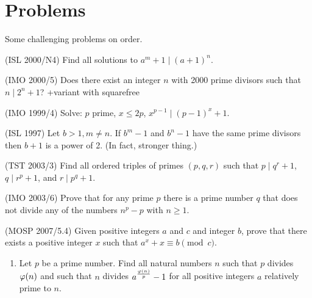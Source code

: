 %
\section{Problems}
Some challenging problems on order.

(ISL 2000/N4) Find all solutions to $a^m+1\mid (a+1)^n$.

(IMO 2000/5) Does there exist an integer $n$ with 2000 prime divisors such that $n\mid 2^n+1$? +variant with squarefree

(IMO 1999/4) Solve: $p$ prime, $x\le 2p$, $x^{p-1}\mid (p-1)^x+1$.

(ISL 1997) Let $b>1,m\ne n$. If $b^m-1$ and $b^n-1$ have the same prime divisors then $b+1$ is a power of 2. (In fact, stronger thing.)

(TST 2003/3) Find all ordered triples of primes $(p,q,r)$ such that $p\mid q^r+1$, $q\mid r^p+1$, and $r\mid p^q+1$.

(IMO 2003/6) Prove that for any prime $p$ there is a prime number $q$ that does not divide any of the numbers $n^p-p$ with $n\ge 1$.

(MOSP 2007/5.4) Given positive integers $a$ and $c$ and integer $b$, prove that there exists a positive integer $x$ such that $a^x+x\equiv b\pmod c$.


\begin{enumerate}
\item
Let $p$ be a prime number. Find all natural numbers $n$ such that $p$ divides $\varphi(n)$ and such that $n$ divides $a^{\frac{\varphi(n)}{p}}-1$ for all positive integers $a$ relatively prime to $n$.
\end{enumerate}
%
